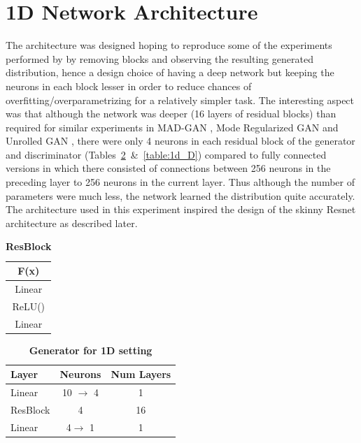 \section{1D Network Architecture}
The architecture was designed hoping to reproduce some of the experiments performed by \cite{veit2016residual} by removing blocks and observing the resulting generated distribution, hence a design choice of having a deep network but keeping the neurons in each block lesser in order to reduce chances of overfitting/overparametrizing for a relatively simpler task. The interesting aspect was that although the network was deeper (16 layers of residual blocks) than required for similar experiments in MAD-GAN \cite{ghosh2017multi}, Mode Regularized GAN \cite{che2016mode} and Unrolled GAN \cite{metz2017unrolledGAN}, there were only 4 neurons in each residual block of the generator and discriminator (Tables~\ref{table:1d_G}~\&~\ref{table:1d_D}) compared to fully connected versions in which there consisted of connections between 256 neurons in the preceding layer to 256 neurons in the current layer. Thus although the number of parameters were much less, the network learned the distribution quite accurately. The architecture used in this experiment inspired the design of the skinny Resnet architecture as described later.

\begin{table}[ht]
\caption{\textbf{ResBlock}} %
\centering %
\begin{tabular}{c} %
\toprule
\textbf{F(x)}\\\midrule
Linear\\ %
ReLU() \\
Linear\\
\bottomrule %
\end{tabular}
\label{table:resblock} %
\end{table}

\begin{table}[ht]
\caption{\textbf{Generator for 1D setting}} %
\centering %
\begin{tabular}{l c c}
\toprule
\textbf{Layer} & \textbf{Neurons} & \textbf{Num Layers} \\ \midrule
Linear & 10 $\rightarrow$ 4 & 1  \\ %
ResBlock & 4 & 16 \\ 
Linear & 4$\rightarrow$ 1 & 1 \\ 
\bottomrule %
\end{tabular}
\label{table:1d_G} %
\end{table}

